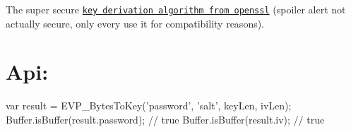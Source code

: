 The super secure \href{https://wiki.openssl.org/index.php/Manual:EVP_BytesToKey(3)}{\tt key derivation algorithm from openssl} (spoiler alert not actually secure, only every use it for compatibility reasons).

\section*{Api\+: }


\begin{DoxyCode}
var result = EVP\_BytesToKey('password', 'salt', keyLen, ivLen);
Buffer.isBuffer(result.password); // true
Buffer.isBuffer(result.iv); // true
\end{DoxyCode}
 